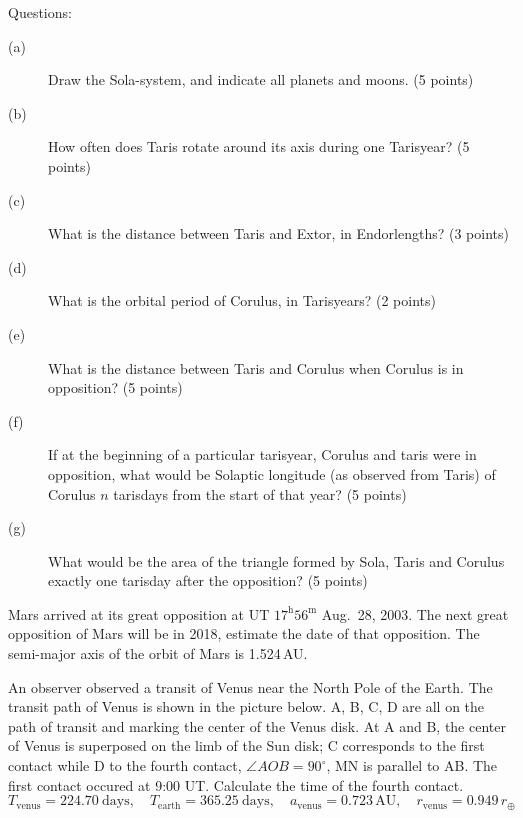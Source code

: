 Questions:
\begin{description}
\item[(a)] Draw the Sola-system, and indicate all planets and moons.
  \hfill(5 points)
\item[(b)] How often does Taris rotate around its axis during one Tarisyear?
  \hfill(5 points)
\item[(c)] What is the distance between Taris and Extor, in Endorlengths?
  \hfill(3 points)
\item[(d)] What is the orbital period of Corulus, in Tarisyears?
  \hfill(2 points)
\item[(e)] What is the distance between Taris and Corulus when Corulus is in
  opposition? \hfill(5 points)
\item[(f)] If at the beginning of a particular tarisyear, Corulus and taris
  were in opposition, what would be Solaptic longitude (as observed from Taris)
  of Corulus $n$ tarisdays from the start of that year? \hfill(5 points)
\item[(g)] What would be the area of the triangle formed by Sola, Taris and
  Corulus exactly one tarisday after the opposition? \hfill(5 points)
\end{description}

Mars arrived at its great opposition at UT $17^{\mathrm{h}}56^{\mathrm{m}}$
Aug.\ 28, 2003. The next great opposition of Mars will be in 2018, estimate the
date of that opposition. The semi-major axis of the orbit of Mars is
1.524\,AU.

An observer observed a transit of Venus near the North Pole of the Earth. The
transit path of Venus is shown in the picture below. A, B, C, D are all on the
path of transit and marking the center of the Venus disk. At A and B, the
center of Venus is superposed on the limb of the Sun disk; C corresponds to the
first contact while D to the fourth contact, $\angle AOB = 90^\circ$, MN is
parallel to AB. The first contact occured at 9:00 UT. Calculate the time of the
fourth contact.
\[ T_{\mathrm{venus}} = 224.70\ \mathrm{days}, \quad
   T_{\mathrm{earth}} = 365.25\ \mathrm{days}, \quad
   a_{\mathrm{venus}} = 0.723\,\mathrm{AU}, \quad
   r_{\mathrm{venus}} = 0.949\,r_\oplus \]

